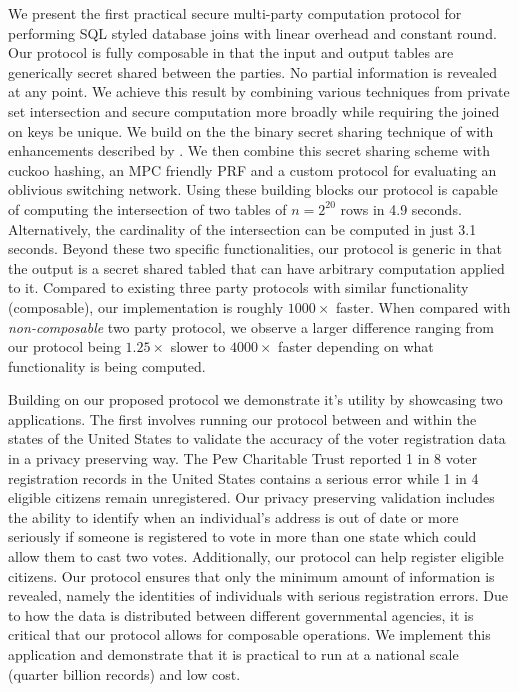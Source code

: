We present the first practical secure multi-party computation protocol for performing SQL styled database joins with linear overhead and constant round. Our protocol is fully composable in that the input and output tables are generically secret shared between the parties. No partial information is revealed at any point. We achieve this result by combining various techniques from private set intersection and secure computation more broadly while requiring the joined on keys be unique. We build on the the binary secret sharing technique of \cite{highthroughput} with enhancements described by \cite{aby3}. We then combine this secret sharing scheme with cuckoo hashing\cite{usenix:PSZ14}, an MPC friendly PRF\cite{lowmc} and a custom protocol for evaluating an oblivious switching network\cite{MS13}. Using these building blocks our protocol is capable of computing the intersection of two tables of $n=2^{20}$ rows in 4.9 seconds.  Alternatively, the cardinality of the intersection can be computed in just 3.1 seconds. Beyond these two specific functionalities, our protocol is generic in that the output is a secret shared tabled that can have arbitrary computation applied to it. Compared to existing three party protocols with similar functionality (composable), our implementation is roughly $1000\times$ faster. When compared with \emph{non-composable} two party protocol, we observe a larger difference ranging from our protocol being $1.25\times$ slower to $4000\times$ faster depending on what functionality is being computed. 


Building on our proposed protocol we demonstrate it's utility by showcasing two applications. The first involves running our protocol between and within the states of the United States to validate the accuracy of the voter registration data in a privacy preserving way. The Pew Charitable Trust\cite{pew} reported 1 in 8 voter registration records in the United States contains a serious error while 1 in 4 eligible citizens remain unregistered. Our privacy preserving validation includes the ability to identify when an individual's address is out of date or more seriously if someone is registered to vote in more than one state which could allow them to cast two votes. Additionally, our protocol can help register eligible citizens. Our protocol ensures that only the minimum amount of information is revealed, namely the identities of individuals with serious registration errors. Due to how the data is distributed between different governmental agencies, it is critical that our protocol allows for composable operations. We implement this application and demonstrate that it is practical to run at a national scale (quarter billion records) and low cost.

